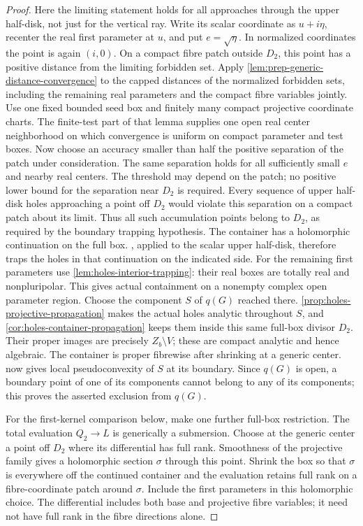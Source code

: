 \begin{proof}
Here the limiting statement holds for all approaches through the upper half-disk, not just for the vertical ray.  Write its scalar coordinate as $u+i\eta$, recenter the real first parameter at $u$, and put $e=\sqrt\eta$.  In normalized coordinates the point is again $(i,0)$.  On a compact fibre patch outside $D_2$, this point has a positive distance from the limiting forbidden set.  Apply \cref{lem:prep-generic-distance-convergence} to the capped distances of the normalized forbidden sets, including the remaining real parameters and the compact fibre variables jointly.  Use one fixed bounded seed box and finitely many compact projective coordinate charts.  The finite-test part of that lemma supplies one open real center neighborhood on which convergence is uniform on compact parameter and test boxes.  Now choose an accuracy smaller than half the positive separation of the patch under consideration.  The same separation holds for all sufficiently small $e$ and nearby real centers.  The threshold may depend on the patch; no positive lower bound for the separation near $D_2$ is required.  Every sequence of upper half-disk holes approaching a point off $D_2$ would violate this separation on a compact patch about its limit.  Thus all such accumulation points belong to $D_2$, as required by the boundary trapping hypothesis.  The container has a holomorphic continuation on the full box. , applied to the scalar upper half-disk, therefore traps the holes in that continuation on the indicated side.  For the remaining first parameters use \cref{lem:holes-interior-trapping}: their real boxes are totally real and nonpluripolar.  This gives actual containment on a nonempty complex open parameter region.  Choose the component $S$ of $q(G)$ reached there.  \cref{prop:holes-projective-propagation} makes the actual holes analytic throughout $S$, and \cref{cor:holes-container-propagation} keeps them inside this same full-box divisor $D_2$. Their proper images are precisely $Z_b\setminus V$; these are compact analytic and hence algebraic.  The container is proper fibrewise after shrinking at a generic center.  now gives local pseudoconvexity of $S$ at its boundary.  Since $q(G)$ is open, a boundary point of one of its components cannot belong to any of its components; this proves the asserted exclusion from $q(G)$.

For the first-kernel comparison below, make one further full-box restriction.  The total evaluation $Q_2\to L$ is generically a submersion.  Choose at the generic center a point off $D_2$ where its differential has full rank.  Smoothness of the projective family gives a holomorphic section $\sigma$ through this point. Shrink the box so that $\sigma$ is everywhere off the continued container and the evaluation retains full rank on a fibre-coordinate patch around $\sigma$.  Include the first parameters in this holomorphic choice.  The differential includes both base and projective fibre variables; it need not have full rank in the fibre directions alone.


\end{proof}
